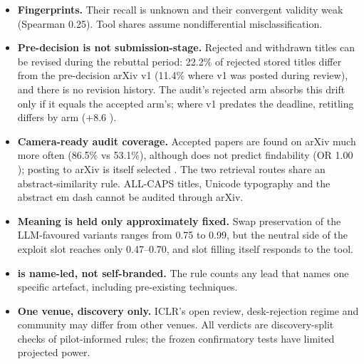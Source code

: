 \begin{itemize}
\item \textbf{Fingerprints.} Their recall is unknown and their convergent validity weak (Spearman 0.25). Tool shares assume nondifferential misclassification.
\item \textbf{Pre-decision is not submission-stage.} Rejected and withdrawn titles can be revised during the rebuttal period: 22.2\% of rejected stored titles differ from the pre-decision arXiv v1 (11.4\% where v1 was posted during review), and there is no revision history. The audit's rejected arm absorbs this drift only if it equals the accepted arm's; where v1 predates the deadline, retitling differs by arm ($+8.6$\pp{} ).
\item \textbf{Camera-ready audit coverage.} Accepted papers are found on arXiv much more often (86.5\% vs 53.1\%), although \NAME{} does not predict findability (OR 1.00 ); posting to arXiv is itself selected \citep{rastogi2022arxiv}. The two retrieval routes share an abstract-similarity rule. ALL-CAPS titles, Unicode typography and the abstract em dash cannot be audited through arXiv.
\item \textbf{Meaning is held only approximately fixed.} Swap preservation of the LLM-favoured variants ranges from 0.75 to 0.99, but the neutral side of the exploit slot reaches only 0.47--0.70, and slot filling itself responds to the tool.
\item \textbf{\NAME{} is name-led, not self-branded.} The rule counts any lead that names one specific artefact, including pre-existing techniques.
\item \textbf{One venue, discovery only.} ICLR's open review, desk-rejection regime and community may differ from other venues. All verdicts are discovery-split checks of pilot-informed rules; the frozen confirmatory tests have limited projected power.
\end{itemize}
